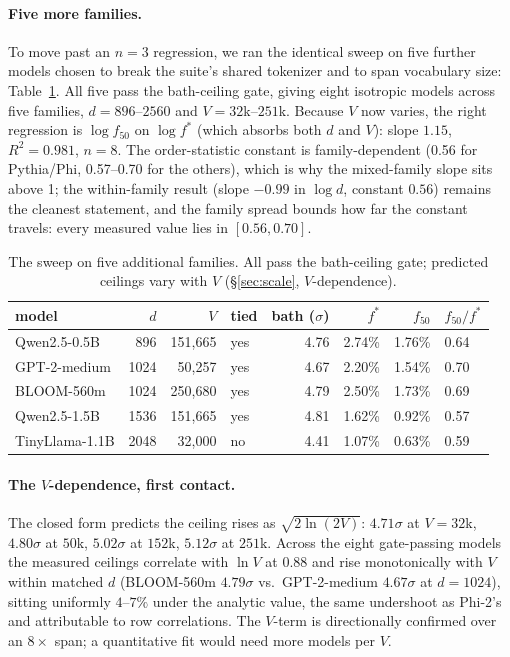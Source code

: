 \documentclass[11pt]{article}
\newcommand{\fstar}{f^{*}}
\begin{document}
\paragraph{Five more families.} To move past an $n{=}3$ regression,
we ran the identical sweep on five further models chosen to break the
suite's shared tokenizer and to span vocabulary size:
Table~\ref{tab:scale2}. All five pass the bath-ceiling gate, giving
eight isotropic models across five families, $d = 896$--$2560$ and
$V = 32$k--$251$k. Because $V$ now varies, the right regression is
$\log f_{50}$ on $\log \fstar$ (which absorbs both $d$ and $V$):
slope $1.15$, $R^2 = 0.981$, $n{=}8$. The order-statistic constant
is family-dependent (0.56 for Pythia/Phi, 0.57--0.70 for
the others), which is why the mixed-family slope sits above 1; the
within-family result (slope $-0.99$ in $\log d$, constant $0.56$)
remains the cleanest statement, and the family spread bounds how far
the constant travels: every measured value lies in $[0.56, 0.70]$.

\begin{table}[t]
\centering
\small
\begin{tabular}{lrrlrrrl}
\toprule
model & $d$ & $V$ & tied & bath ($\sigma$) & $\fstar$ & $f_{50}$ &
$f_{50}/\fstar$ \\
\midrule
Qwen2.5-0.5B & 896 & 151{,}665 & yes & 4.76 & 2.74\% & 1.76\% & 0.64 \\
GPT-2-medium & 1024 & 50{,}257 & yes & 4.67 & 2.20\% & 1.54\% & 0.70 \\
BLOOM-560m & 1024 & 250{,}680 & yes & 4.79 & 2.50\% & 1.73\% & 0.69 \\
Qwen2.5-1.5B & 1536 & 151{,}665 & yes & 4.81 & 1.62\% & 0.92\% & 0.57 \\
TinyLlama-1.1B & 2048 & 32{,}000 & no & 4.41 & 1.07\% & 0.63\% & 0.59 \\
\bottomrule
\end{tabular}
\caption{The sweep on five additional families. All pass the
bath-ceiling gate; predicted ceilings vary with $V$
(\S\ref{sec:scale}, $V$-dependence).}
\label{tab:scale2}
\end{table}

\paragraph{The $V$-dependence, first contact.} The closed form
predicts the ceiling rises as $\sqrt{2\ln(2V)}$: $4.71\sigma$ at
$V{=}32$k, $4.80\sigma$ at $50$k, $5.02\sigma$ at $152$k,
$5.12\sigma$ at $251$k. Across the eight gate-passing models the
measured ceilings correlate with $\ln V$ at $0.88$ and rise
monotonically with $V$ within matched $d$ (BLOOM-560m $4.79\sigma$
vs.\ GPT-2-medium $4.67\sigma$ at $d{=}1024$), sitting uniformly
$4$--$7\%$ under the analytic value, the same undershoot as
Phi-2's and attributable to row correlations. The $V$-term is
directionally confirmed over an $8\times$ span; a quantitative fit
would need more models per $V$.
\end{document}
